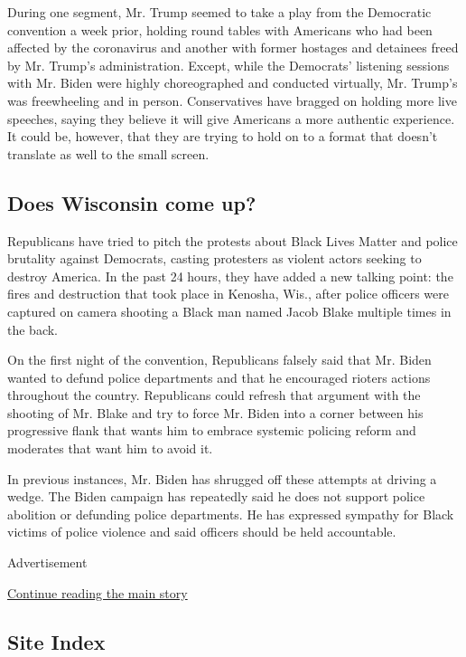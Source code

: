 During one segment, Mr. Trump seemed to take a play from the Democratic
convention a week prior, holding round tables with Americans who had
been affected by the coronavirus and another with former hostages and
detainees freed by Mr. Trump's administration. Except, while the
Democrats' listening sessions with Mr. Biden were highly choreographed
and conducted virtually, Mr. Trump's was freewheeling and in person.
Conservatives have bragged on holding more live speeches, saying they
believe it will give Americans a more authentic experience. It could be,
however, that they are trying to hold on to a format that doesn't
translate as well to the small screen.

\hypertarget{does-wisconsin-come-up}{%
\subsection{Does Wisconsin come up?}\label{does-wisconsin-come-up}}

Republicans have tried to pitch the protests about Black Lives Matter
and police brutality against Democrats, casting protesters as violent
actors seeking to destroy America. In the past 24 hours, they have added
a new talking point: the fires and destruction that took place in
Kenosha, Wis., after police officers were captured on camera shooting a
Black man named Jacob Blake multiple times in the back.

On the first night of the convention, Republicans falsely said that Mr.
Biden wanted to defund police departments and that he encouraged rioters
actions throughout the country. Republicans could refresh that argument
with the shooting of Mr. Blake and try to force Mr. Biden into a corner
between his progressive flank that wants him to embrace systemic
policing reform and moderates that want him to avoid it.

In previous instances, Mr. Biden has shrugged off these attempts at
driving a wedge. The Biden campaign has repeatedly said he does not
support police abolition or defunding police departments. He has
expressed sympathy for Black victims of police violence and said
officers should be held accountable.

Advertisement

\protect\hyperlink{after-bottom}{Continue reading the main story}

\hypertarget{site-index}{%
\subsection{Site Index}\label{site-index}}


